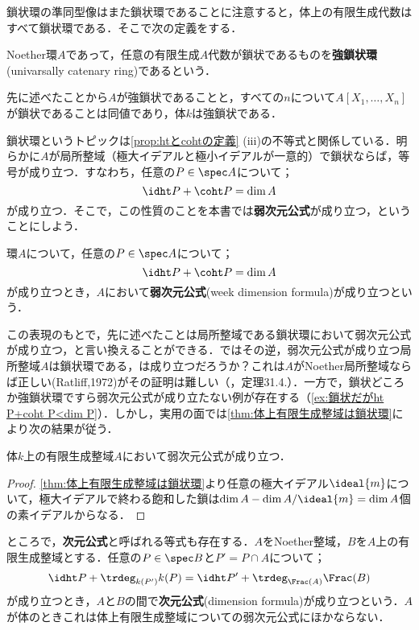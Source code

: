 鎖状環の準同型像はまた鎖状環であることに注意すると，体上の有限生成代数はすべて鎖状環である．そこで次の定義をする．

\begin{defi}[強鎖状環]
	Noether環$A$であって，任意の有限生成$A$代数が鎖状であるものを\textbf{強鎖状環}(univarsally catenary ring)であるという．
\end{defi}

先に述べたことから$A$が強鎖状であることと，すべての$n$について$A[X_1,\dots,X_n]$が鎖状であることは同値であり，体$k$は強鎖状である．

鎖状環というトピックは\ref{prop:htとcohtの定義} (iii)の不等式と関係している．明らかに$A$が局所整域（極大イデアルと極小イデアルが一意的）で鎖状ならば，等号が成り立つ．すなわち，任意の$P\in\spec A$について；
\[\idht P +\coht P =\dim A\]
が成り立つ．そこで，この性質のことを本書では\textbf{弱次元公式}が成り立つ，ということにしよう．

\begin{defi}[弱次元公式]\label{defi:弱次元公式}
	環$A$について，任意の$P\in\spec A$について；
	\[\idht P+\coht P=\dim A\]
	が成り立つとき，$A$において\textbf{弱次元公式}(week dimension formula)が成り立つという．
\end{defi}

この表現のもとで，先に述べたことは局所整域である鎖状環において弱次元公式が成り立つ，と言い換えることができる．ではその逆，弱次元公式が成り立つ局所整域$A$は鎖状環である，は成り立つだろうか？これは$A$がNoether局所整域ならば正しい(Ratliff,1972)がその証明は難しい（\cite{matsu}，定理31.4.）．一方で，鎖状どころか強鎖状環ですら弱次元公式が成り立たない例が存在する（\ref{ex:鎖状だがht P+coht P<dim P}）．しかし，実用の面では\ref{thm:体上有限生成整域は鎖状環}により次の結果が従う．

\begin{prop}\label{prop:DIM}
	体$k$上の有限生成整域$A$において弱次元公式が成り立つ．
\end{prop}

\begin{proof}
	\ref{thm:体上有限生成整域は鎖状環}より任意の極大イデアル$\ideal{m}$について，極大イデアルで終わる飽和した鎖は$\dim A-\dim A/\ideal{m}=\dim A$個の素イデアルからなる．
\end{proof}

ところで，\textbf{次元公式}と呼ばれる等式も存在する．$A$をNoether整域，$B$を$A$上の有限生成整域とする．任意の$P\in\spec B$と$P'=P\cap A$について；
\[\idht P+\trdeg_{k(P')} k(P)=\idht P'+\trdeg_{\Frac(A)} \Frac(B)\]
が成り立つとき，$A$と$B$の間で\textbf{次元公式}(dimension formula)が成り立つという．$A$が体のときこれは体上有限生成整域についての弱次元公式にほかならない．


